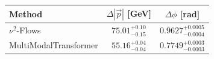    \begin{tabular}{lcc}
        \toprule
        Method & $\Delta |\vec p|$ [GeV] & $\Delta \phi$ [rad] \\
        \midrule
        $\nu^2$-Flows & $75.01^{+0.10}_{-0.15}$ & $0.9627^{+0.0005}_{-0.0004}$ \\
        MultiModalTransformer & $55.16^{+0.04}_{-0.04}$ & $0.7749^{+0.0003}_{-0.0003}$ \\
        \bottomrule
    \end{tabular}
